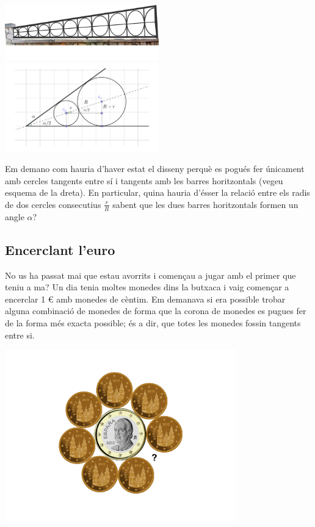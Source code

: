\includegraphics*[width=0.5\textwidth]{img-03/barrera}
\includegraphics*[width=0.5\textwidth]{img-03/chap-trig-barrera-scheme}

Em demano com hauria d'haver estat el disseny perquè es pogués fer únicament amb cercles tangents entre sí i tangents amb les barres horitzontals (vegeu esquema de la dreta). En particular, quina hauria d'ésser la relació entre els radis de dos cercles consecutius $\frac{r}{R}$ sabent que les dues barres horitzontals formen un angle $\alpha$?

\subsection*{Encerclant l'euro}

\begin{minipage}{0.7\textwidth}
No us ha passat mai que estau avorrits i començau a jugar amb el primer que teniu a ma? Un dia tenia moltes monedes dins la butxaca i vaig començar a encerclar 1 € amb monedes de cèntim. Em demanava si era possible trobar alguna combinació de monedes de forma que la corona de monedes es pugues fer de la forma més exacta possible; és a dir, que totes les monedes fossin tangents entre si.
\end{minipage}
\begin{minipage}{0.3\textwidth}
 \includegraphics*[width=0.75\textwidth]{img-03/monedes}
\end{minipage}

